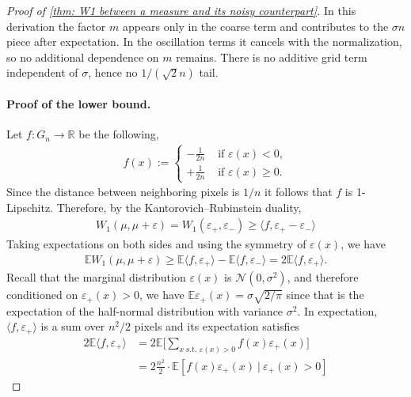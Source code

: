 \documentclass{article}
\theoremstyle{plain}
\theoremstyle{definition}
\theoremstyle{remark}
\begin{document}
\begin{proof}[Proof of \cref{thm: W1 between a measure and its noisy counterpart}]
In this derivation the factor $m$ appears only in the coarse term and contributes to the $\sigma n$ piece after expectation. In the oscillation terms it cancels with the normalization, so no additional dependence on $m$ remains. There is no additive grid term independent of $\sigma$, hence no $1/(\sqrt{2}n)$ tail.

\paragraph{Proof of the lower bound.}

Let $f: G_n \to \mathbb{R}$ be the following,
\begin{align}
    f(x)
    :=
    \begin{cases}
        -\tfrac{1}{2n} & \text{ if } \varepsilon(x) < 0, \\ 
        +\tfrac{1}{2n} & \text{ if } \varepsilon(x) \ge 0. 
    \end{cases}
\end{align}
Since the distance between neighboring pixels is $1/n$ it follows that $f$ is 1-Lipschitz.
Therefore, by the Kantorovich--Rubinstein duality,
\begin{align}
    W_1(\mu,\mu+\varepsilon)
    =
    W_1(\varepsilon_+, \varepsilon_-)
    \ge
    \langle
        f,\varepsilon_+
        -
        \varepsilon_-
    \rangle
\end{align}
Taking expectations on both sides and using the symmetry of $\varepsilon(x)$, we have
\begin{align}
    \mathbb{E} W_1(\mu,\mu+\varepsilon)
    \ge
    \mathbb{E}
    \langle
        f, \varepsilon_+
    \rangle
    -
    \mathbb{E}
    \langle
        f,\varepsilon_-
    \rangle
    =
    2\mathbb{E}
    \langle
        f, \varepsilon_+
    \rangle.
\end{align}
Recall that the marginal distribution $\varepsilon(x)$ is $\mathcal{N}(0, \sigma^2)$, and therefore conditioned on $\varepsilon_+(x) > 0$, we have $\mathbb{E}\varepsilon_+(x) = \sigma \sqrt{2/\pi}$ since that is the expectation of the half-normal distribution with variance $\sigma^2$.
In expectation, $\langle f, \varepsilon_+ \rangle$ is a sum over $n^2/2$ pixels and its expectation satisfies
\begin{align}
    2\mathbb{E} \langle f, \varepsilon_+ \rangle
    &=
    2 \mathbb{E} \Bigg[ \sum_{x \text{ s.t. } \varepsilon(x) > 0} f(x) \varepsilon_+(x) \Bigg]
    \\
    &=
    2 \frac{n^2}{2} \cdot \mathbb{E} \left[ f(x) \varepsilon_+(x) \ |\  \varepsilon_+(x) > 0 \right] \nonumber

\end{align}
\end{proof}
\end{document}
